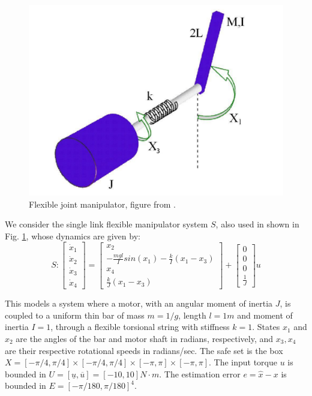 \begin{figure}
	\includegraphics[scale=0.2]{figs/ManipArm.pdf}
	\caption{Flexible joint manipulator, figure from \cite{intech}.}
	\label{fig:manipulator fig}
\end{figure}

We consider the single link flexible manipulator system $S$, also used in \cite{intech}  shown in Fig. \ref{fig:manipulator fig}, whose dynamics are given by:
\begin{equation}
S: \begin{bmatrix} \dot{x}_1 \\ \dot{x}_2 \\ \dot{x}_3 \\ \dot{x}_4    \end{bmatrix} = \begin{bmatrix} x_2 \\ -\frac{mgl}{I}sin(x_1) - \frac{k}{I}(x_1-x_3)  \\ x_4 \\ \frac{k}{J}(x_1-x_3)  \end{bmatrix} + \begin{bmatrix} 0 \\ 0 \\ 0 \\ \frac{1}{J} \end{bmatrix}u
\end{equation}

This models a system where a motor, with an angular moment of inertia $J$,  is coupled to a uniform thin bar of mass $m=1/g$, length $l=1m$ and moment of inertia $I=1$, through a flexible torsional string with stiffness $k=1$. 
States $x_1$ and $x_2$ are the angles of the bar and motor shaft in radians, respectively, and $x_3, x_4$ are their respective rotational speeds in radians/sec.
The safe set is the box $X = [-\pi/4,\pi/4] \times [-\pi/4,\pi/4] \times [-\pi,\pi] \times [-\pi,\pi]$.
The input torque $u$ is bounded in $U = [\underline{u}, \overline{u}] = [-10 , 10 ]N\cdot m$. 
The estimation error $e = \hat{x} - x$ is bounded in $E = [-\pi /180, \pi /180]^4$.

